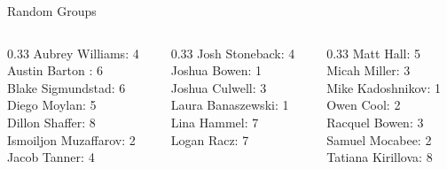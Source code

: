 \documentclass[10pt]{beamer}
\begin{document}
\begin{frame}{Random Groups}

\begin{columns}
\begin{column}{0.33\textwidth}
Aubrey Williams: 4 \\ 
Austin Barton : 6 \\ 
Blake Sigmundstad: 6 \\ 
Diego Moylan: 5 \\ 
Dillon Shaffer: 8 \\ 
Ismoiljon Muzaffarov: 2 \\ 
Jacob Tanner: 4 \\\end{column}
\begin{column}{0.33\textwidth}
Josh Stoneback: 4 \\ 
Joshua Bowen: 1 \\ 
Joshua Culwell: 3 \\ 
Laura Banaszewski: 1 \\ 
Lina Hammel: 7 \\ 
Logan Racz: 7 \\\end{column}
\begin{column}{0.33\textwidth}
Matt Hall: 5 \\ 
Micah Miller: 3 \\ 
Mike Kadoshnikov: 1 \\ 
Owen Cool: 2 \\ 
Racquel Bowen: 3 \\ 
Samuel Mocabee: 2 \\ 
Tatiana Kirillova: 8 \\\end{column}
\end{columns}
\end{frame}
\end{document}
